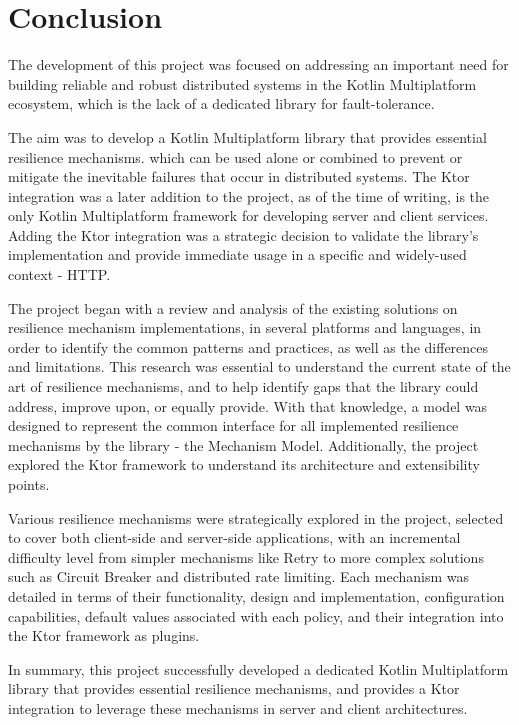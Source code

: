 \chapter{Conclusion}\label{ch:conclusion}

The development of this project was focused
on addressing an important need
for building reliable and robust distributed systems in the Kotlin Multiplatform ecosystem, which is the lack of a dedicated library for fault-tolerance.

The aim was to develop a Kotlin Multiplatform library
that provides essential resilience mechanisms.
which can be used alone or combined to prevent or mitigate the inevitable failures that occur in distributed systems.
The Ktor integration was a later addition to the project, as of the time of writing,
is the only Kotlin Multiplatform framework for developing server and client services.
Adding the Ktor integration was a strategic decision to validate the library's implementation
and provide immediate usage in a specific and widely-used context - HTTP.

The project began with a review and analysis
of the existing solutions on resilience mechanism implementations,
in several platforms and languages,
in order to identify the common patterns and practices, as well as the differences and limitations.
This research was essential to understand the current state of the art of resilience mechanisms,
and to help identify gaps that the library could address, improve upon, or equally provide.
With that knowledge,
a model was designed to represent the common interface for all implemented resilience mechanisms by the library -
the Mechanism Model.
Additionally, the project explored the Ktor framework to understand its architecture and extensibility points.

Various resilience mechanisms were strategically explored in the project,
selected to cover both client-side and server-side applications,
with an incremental difficulty level from simpler mechanisms like Retry to more complex solutions such as Circuit Breaker and distributed rate limiting.
Each mechanism was detailed in terms of their functionality, design and implementation, configuration capabilities, default values associated with each policy, and their integration into the Ktor framework as plugins.

In summary,
this project successfully developed a dedicated Kotlin Multiplatform library
that provides essential resilience mechanisms,
and provides a Ktor integration to leverage these mechanisms in server and client architectures.


